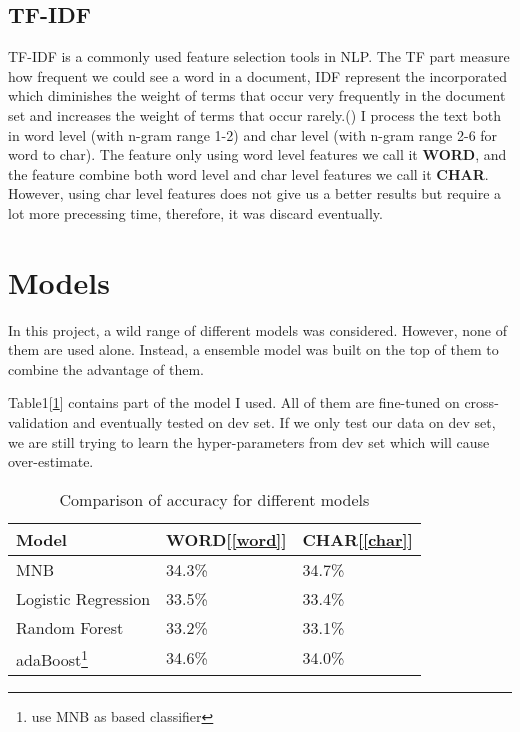 \documentclass[11pt]{article}
\begin{document}
\subsection{TF-IDF}
TF-IDF is a commonly used feature selection tools in NLP.
The TF part measure how frequent we could see a word in a document, 
IDF represent the incorporated which diminishes the weight of terms that 
occur very frequently in the document set and increases the 
weight of terms that occur rarely.()
I process the text both in word level (with n-gram range 1-2) 
and char level (with n-gram range 2-6 for word to char).
The feature only using word level features we call it \textbf{WORD}\label{word}, 
and the feature combine both word level
and char level features we call it \textbf{CHAR}\label{char}.
However, using char level features does not give us a better results 
but require a lot more precessing time, therefore, it was discard eventually.

\section{Models}
\label{models}
In this project, a wild range of different models was considered. However, none of them are used 
alone. Instead, a ensemble model was built on the top of them to combine the advantage of them.

Table1[\ref{accuracy}] contains part of the model I used. All of them are fine-tuned on 
cross-validation and eventually tested on dev set. If 
we only test our data on dev set, we are still trying to learn the
hyper-parameters from dev set which will cause over-estimate.

\begin{table}[h]
  \begin{center}
 \begin{tabular}{|l|l|l|}
 
       \hline
       Model & WORD[\ref{word}] & CHAR[\ref{char}]\\
       \hline\hline
       MNB & 34.3\% & 34.7\% \\
       Logistic Regression & 33.5\% & 33.4\% \\
       Random Forest & 33.2\% & 33.1\% \\
       adaBoost\footnote{use MNB as based classifier} & 34.6\% & 34.0\% \\
       \hline
 
 \end{tabular}
 \caption{Comparison of accuracy for different models}\label{accuracy}
  \end{center}
 \end{table}
\end{document}

